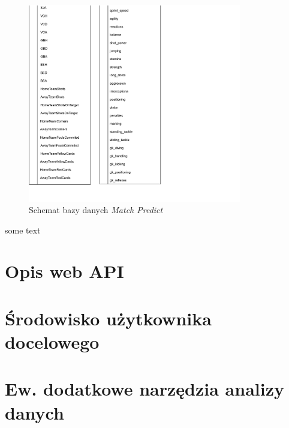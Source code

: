 \begin{figure}[h]
\ContinuedFloat
    \centering
  \includegraphics[width=0.83\textwidth]{figures/match_predict_schema_2.png}%
  \caption{Schemat bazy danych \textit{Match Predict}}
  \label{fig:match_predict_schema}
\end{figure}
some text

\section{Opis web API}
\section{Środowisko użytkownika docelowego}
\section{Ew. dodatkowe narzędzia analizy danych}